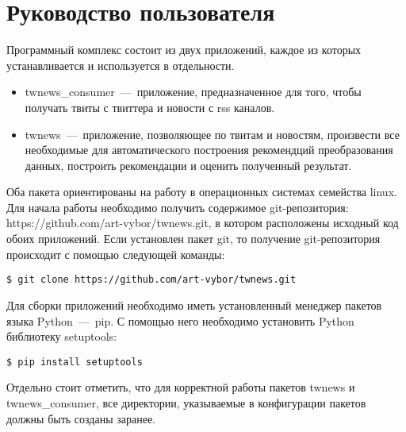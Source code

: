 \section{Руководство пользователя}
\label{sec:documentation}
    Программный комплекс состоит из двух приложений, каждое из которых устанавливается и используется в отдельности.
    \begin{itemize}
        \item twnews\_consumer~---~приложение, предназначенное для того, чтобы получать твиты с твиттера и новости с rss каналов.
        \item twnews~---~приложение, позволяющее по твитам и новостям, произвести все необходимые для автоматического построения рекомендций
        преобразования данных, построить рекомендации и оценить полученный результат.
    \end{itemize}

    Оба пакета ориентированы на работу в операционных системах семейства linux.
    Для начала работы необходимо получить содержимое git-репозитория: https://github.com/art-vybor/twnews.git, в котором расположены исходный код обоих приложений.
    Если установлен пакет git, то получение git-репозитория происходит с помощью следующей команды:
    \begin{lstlisting}
$ git clone https://github.com/art-vybor/twnews.git
    \end{lstlisting}
    Для сборки приложений необходимо иметь установленный менеджер пакетов языка Python~---~pip. С помощью него необходимо установить Python библиотеку setuptools:
    \begin{lstlisting}
$ pip install setuptools
    \end{lstlisting}

    Отдельно стоит отметить, что для корректной работы пакетов twnews и twnews\_consumer, все директории, указываемые в конфигурации пакетов должны быть созданы заранее.

    
    